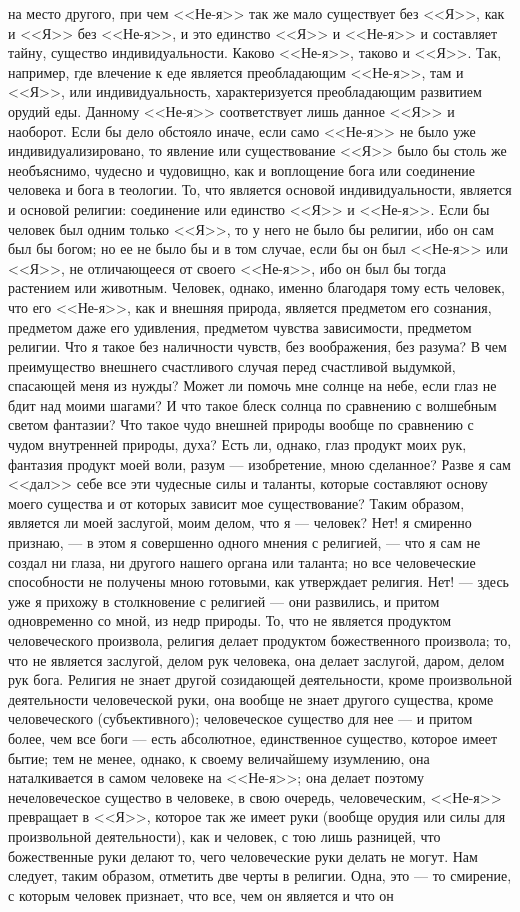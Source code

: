 \documentclass[12pt]{article}
\begin{document}
на место другого, при чем <<Не-я>> так же мало существует без <<Я>>, как и <<Я>> без <<Не-я>>, и это единство <<Я>> и <<Не-я>> и составляет тайну, существо индивидуальности. Каково <<Не-я>>, таково и <<Я>>. Так, например, где влечение к еде является преобладающим <<Не-я>>, там и <<Я>>, или индивидуальность, характеризуется преобладающим развитием орудий еды. Данному <<Не-я>> соответствует лишь данное <<Я>> и наоборот. Если бы дело обстояло иначе, если само <<Не-я>> не было уже индивидуализировано, то явление или существование <<Я>> было бы столь же необъяснимо, чудесно и чудовищно, как и воплощение бога или соединение человека и бога в теологии. То, что является основой индивидуальности, является и основой религии: соединение или единство <<Я>> и <<Не-я>>. Если бы человек был одним только <<Я>>, то у него не было бы религии, ибо он сам был бы богом; но ее не было бы и в том случае, если бы он был <<Не-я>> или <<Я>>, не отличающееся от своего <<Не-я>>, ибо он был бы тогда растением или животным. Человек, однако, именно благодаря тому есть человек, что его <<Не-я>>, как и внешняя природа, является предметом его сознания, предметом даже его удивления, предметом чувства зависимости, предметом религии. Что я такое без наличности чувств, без воображения, без разума? В чем преимущество внешнего счастливого случая перед счастливой выдумкой, спасающей меня из нужды? Может ли помочь мне солнце на небе, если глаз не бдит над моими шагами? И что такое блеск солнца по сравнению с волшебным светом фантазии? Что такое чудо внешней природы вообще по сравнению с чудом внутренней природы, духа? Есть ли, однако, глаз продукт моих рук, фантазия продукт моей воли, разум --- изобретение, мною сделанное? Разве я сам <<дал>> себе все эти чудесные силы и таланты, которые составляют основу моего существа и от которых зависит мое существование? Таким образом, является ли моей заслугой, моим делом, что я --- человек? Нет! я смиренно признаю, --- в этом я совершенно одного мнения с религией, --- что я сам не создал ни глаза, ни другого нашего органа или таланта; но все человеческие способности не получены мною готовыми, как утверждает религия. Нет! --- здесь уже я прихожу в столкновение с религией --- они развились, и притом одновременно со мной, из недр природы. То, что не является продуктом человеческого произвола, религия делает продуктом божественного произвола; то, что не является заслугой, делом рук человека, она делает заслугой, даром, делом рук бога. Религия не знает другой созидающей деятельности, кроме произвольной деятельности человеческой руки, она вообще не знает другого существа, кроме человеческого (субъективного); человеческое существо для нее --- и притом более, чем все боги --- есть абсолютное, единственное существо, которое имеет бытие; тем не менее, однако, к своему величайшему изумлению, она наталкивается в самом человеке на <<Не-я>>; она делает поэтому нечеловеческое существо в человеке, в свою очередь, человеческим, <<Не-я>> превращает в <<Я>>, которое так же имеет руки (вообще орудия или силы для произвольной деятельности), как и человек, с тою лишь разницей, что божественные руки делают то, чего человеческие руки делать не могут. Нам следует, таким образом, отметить две черты в религии. Одна, это --- то смирение, с которым человек признает, что все, чем он является и что он 
\end{document}
